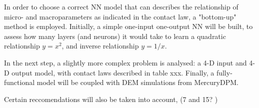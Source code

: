 \documentclass[../BachelorAssignment.tex]{subfiles}
\begin{document}
\graphicspath{{\subfix{../Images/}}}




In order to choose a correct NN model that can describes the relationship of micro- and macroparameters as indicated in the contact law, a "bottom-up" method is employed. Initially, a simple one-input one-output NN will be built, to assess how many layers (and neurons) it would take to learn a quadratic relationship \(y = x^2\), and inverse relationship \(y = 1/x\).

In the next step, a slightly more complex problem is analysed: a 4-D input and 4-D output model, with contact laws described in table xxx. Finally, a fully-functional model will be coupled with DEM simulations from MercuryDPM.   

Certain reccomendations will also be taken into account, (7 and 15? )
\end{document}
